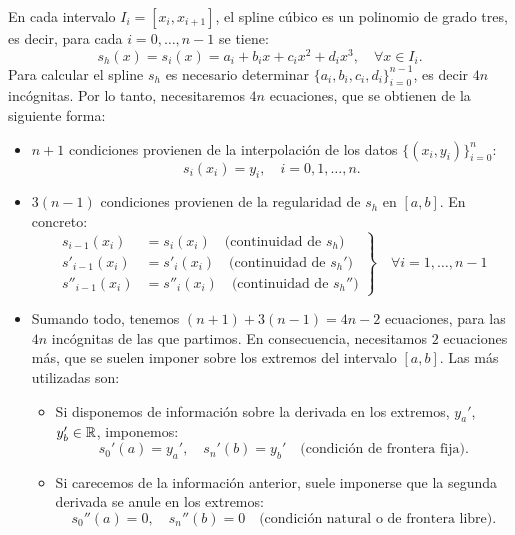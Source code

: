 En cada intervalo $I_i=[x_i, x_{i+1}]$, el spline cúbico es un
polinomio de grado tres, es decir, para cada $i=0,\dots,n-1$ se tiene:
\begin{equation}
  s_h(x) = s_i(x) = a_i + b_ix + c_ix^2 + d_ix^3,\quad
  \forall x\in I_i.
  \label{eq:spline-cubico}
\end{equation}
Para calcular el spline $s_h$ es necesario determinar $\{a_i, b_i,
c_i, d_i\}_{i=0}^{n-1}$, es decir $4n$ incógnitas. Por lo tanto,
necesitaremos $4n$ ecuaciones, que se obtienen de la siguiente forma:
\begin{itemize}
\item $n+1$ condiciones provienen de la interpolación de los datos
  $\{(x_i, y_i)\}_{i=0}^n$:
  $$
  s_i(x_i)=y_i, \quad i=0,1,\dots,n.
  $$
\item $3(n-1)$ condiciones provienen  de la regularidad de $s_h$ en
  $[a,b]$. En concreto:
  \begin{equation*}
    \left.
  \begin{aligned}
    s_{i-1}(x_i)&=s_{i}(x_i) \quad \text{(continuidad de $s_h$)}
    \\
    s'_{i-1}(x_i)&=s'_{i}(x_i) \quad \text{(continuidad de $s_h'$)}
    \\
    s''_{i-1}(x_i)&=s''_{i}(x_i) \quad \text{(continuidad de $s_h''$)}
  \end{aligned}
  \right\} \quad \forall i=1,\dots,n-1 
\end{equation*}
\item Sumando todo, tenemos $(n+1) + 3(n-1) = 4n-2$ ecuaciones, para
  las $4n$ incógnitas de las que partimos. En consecuencia,
  necesitamos $2$ ecuaciones más, que se suelen imponer sobre los
  extremos del intervalo $[a,b]$. Las más utilizadas son:
  \begin{itemize}
  \item Si disponemos de información sobre la derivada en los
    extremos, $y_a'$, $y_b'\in\operatorname{{\mathbb R}}$, imponemos:
    \begin{equation*}
      s_0'(a)=y_a', \quad s_n'(b)=y_b' \quad \text{(condición de frontera fija)}.
    \end{equation*}
  \item Si carecemos de la información anterior, suele imponerse que
    la segunda derivada se anule en los extremos:
    \begin{equation*}
      s_0''(a)=0, \quad s_n''(b)=0 \quad \text{(condición natural o de
        frontera libre)}.
    \end{equation*}
  \end{itemize}
\end{itemize}

